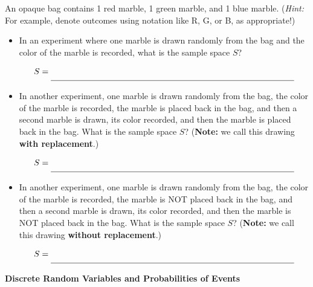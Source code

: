 \documentclass[10pt]{article}
\begin{document}
 An opaque bag contains 1 {\color{red}red} marble, 1 {\color{ForestGreen}green} marble, and 1 {\color{blue}blue} marble. ({\it Hint:} For example, denote outcomes using notation like {\color{red}R}, {\color{ForestGreen}G}, or {\color{blue}B}, as appropriate!)
    \begin{itemize}
    \item[(a)] In an experiment where one marble is drawn randomly from the bag and the color of the marble is recorded, what is the sample space $S$?

    {\Large
    \[
    S = \rule[-8pt]{4in}{0.4pt}
    \]
    }

    \item[(b)] In another experiment, one marble is drawn randomly from the bag, the color of the marble is recorded, the marble is placed back in the bag, and then a second marble is drawn, its color recorded, and then the marble is placed back in the bag. What is the sample space $S$? ({\bf Note:} we call this drawing {\bf with replacement}.)

    {\Large
    \[
    S = \rule[-8pt]{4in}{0.4pt}
    \]
    }

    \item[(c)] In another experiment, one marble is drawn randomly from the bag, the color of the marble is recorded, the marble is NOT placed back in the bag, and then a second marble is drawn, its color recorded, and then the marble is NOT placed back in the bag. What is the sample space $S$? ({\bf Note:} we call this drawing {\bf without replacement}.)

    {\Large
    \[
    S = \rule[-8pt]{4in}{0.4pt}
    \]
    }
    
    \end{itemize}

\newpage%

{\bf Discrete Random Variables and Probabilities of Events}\\
\end{document}
